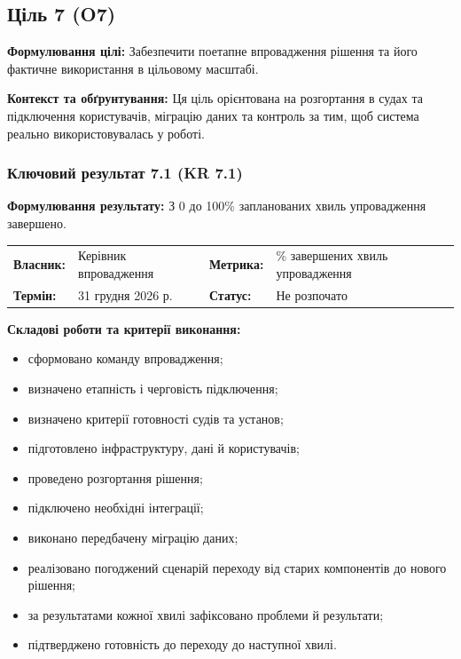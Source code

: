 \documentclass{article}
\begin{document}
\newpage

\subsection{Ціль 7 (O7)}

\textbf{Формулювання цілі:} Забезпечити поетапне впровадження рішення та його фактичне використання в цільовому масштабі.

\textbf{Контекст та обґрунтування:}
Ця ціль орієнтована на розгортання в судах та підключення користувачів, міграцію даних та контроль за тим, щоб система реально використовувалась у роботі.

\subsubsection{Ключовий результат 7.1 (KR 7.1)}

\textbf{Формулювання результату:} З 0 до 100\% запланованих хвиль упровадження завершено.

\noindent\begin{tabular}{@{}p{2.2cm}p{4.5cm}p{2.2cm}p{4.5cm}@{}}
\toprule
\textbf{Власник:} & Керівник впровадження & \textbf{Метрика:} & \% завершених хвиль упровадження \\
\textbf{Термін:} & 31 грудня 2026 р. & \textbf{Статус:} & Не розпочато \\
\bottomrule
\end{tabular}

\vspace{10pt}
\textbf{Складові роботи та критерії виконання:}
\begin{itemize}
    \item сформовано команду впровадження;
    \item визначено етапність і черговість підключення;
    \item визначено критерії готовності судів та установ;
    \item підготовлено інфраструктуру, дані й користувачів;
    \item проведено розгортання рішення;
    \item підключено необхідні інтеграції;
    \item виконано передбачену міграцію даних;
    \item реалізовано погоджений сценарій переходу від старих компонентів до нового рішення;
    \item за результатами кожної хвилі зафіксовано проблеми й результати;
    \item підтверджено готовність до переходу до наступної хвилі.
\end{itemize}
\end{document}
